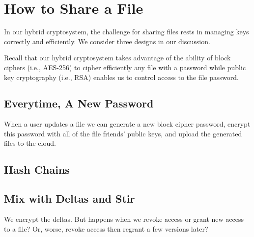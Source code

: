 \section{How to Share a File}

In our hybrid cryptosystem, the challenge for sharing files rests in
managing keys correctly and efficiently. We consider three designs in
our discussion.

Recall that our hybrid cryptosystem takes advantage of the ability of
block ciphers (i.e., AES-256) to cipher efficiently any file with a
password while public key cryptography (i.e., RSA) enables us to
control access to the file password.

\subsection{Everytime, A New Password}

When a user updates a file we can generate a new block cipher
password, encrypt this password with all of the file friends' public
keys, and upload the generated files to the cloud.

\subsection{Hash Chains}


\subsection{Mix with Deltas and Stir}

We encrypt the deltas. But happens when we revoke access or grant new
access to a file? Or, worse, revoke access then regrant a few versions
later?


